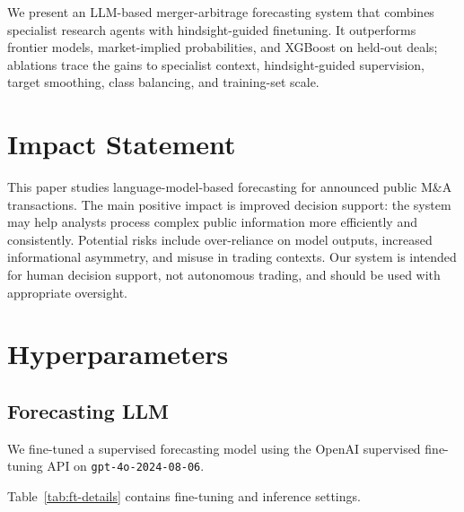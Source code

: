 \documentclass{article}
\theoremstyle{plain}
\theoremstyle{definition}
\theoremstyle{remark}
\begin{document}
We present an LLM-based merger-arbitrage forecasting system that combines specialist research agents with hindsight-guided finetuning. It outperforms frontier models, market-implied probabilities, and XGBoost on held-out deals; ablations trace the gains to specialist context, hindsight-guided supervision, target smoothing, class balancing, and training-set scale.

\newpage

\section*{Impact Statement}
This paper studies language-model-based forecasting for announced public M\&A transactions. The main positive impact is improved decision support: the system may help analysts process complex public information more efficiently and consistently. Potential risks include over-reliance on model outputs, increased informational asymmetry, and misuse in trading contexts. Our system is intended for human decision support, not autonomous trading, and should be used with appropriate oversight.



\newpage
\appendix
\onecolumn

\section{Hyperparameters}
\label{implementation-details}

\subsection{Forecasting LLM}
\label{fine-tuning-details}

We fine-tuned a supervised forecasting model using the OpenAI supervised fine-tuning API on \texttt{gpt-4o-2024-08-06}. 

Table~\ref{tab:ft-details} contains fine-tuning and inference settings. 
\end{document}
